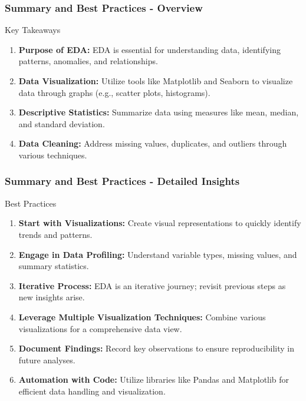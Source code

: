 \documentclass{beamer}
\begin{document}
\begin{frame}[fragile]
    \frametitle{Summary and Best Practices - Overview}
    \begin{block}{Key Takeaways}
        \begin{enumerate}
            \item \textbf{Purpose of EDA:} EDA is essential for understanding data, identifying patterns, anomalies, and relationships.
            \item \textbf{Data Visualization:} Utilize tools like Matplotlib and Seaborn to visualize data through graphs (e.g., scatter plots, histograms).
            \item \textbf{Descriptive Statistics:} Summarize data using measures like mean, median, and standard deviation.
            \item \textbf{Data Cleaning:} Address missing values, duplicates, and outliers through various techniques.
        \end{enumerate}
    \end{block}
\end{frame}

\begin{frame}[fragile]
    \frametitle{Summary and Best Practices - Detailed Insights}
    \begin{block}{Best Practices}
        \begin{enumerate}
            \item \textbf{Start with Visualizations:} Create visual representations to quickly identify trends and patterns.
            \item \textbf{Engage in Data Profiling:} Understand variable types, missing values, and summary statistics.
            \item \textbf{Iterative Process:} EDA is an iterative journey; revisit previous steps as new insights arise.
            \item \textbf{Leverage Multiple Visualization Techniques:} Combine various visualizations for a comprehensive data view.
            \item \textbf{Document Findings:} Record key observations to ensure reproducibility in future analyses.
            \item \textbf{Automation with Code:} Utilize libraries like Pandas and Matplotlib for efficient data handling and visualization.
        \end{enumerate}
    \end{block}
\end{frame}
\end{document}
